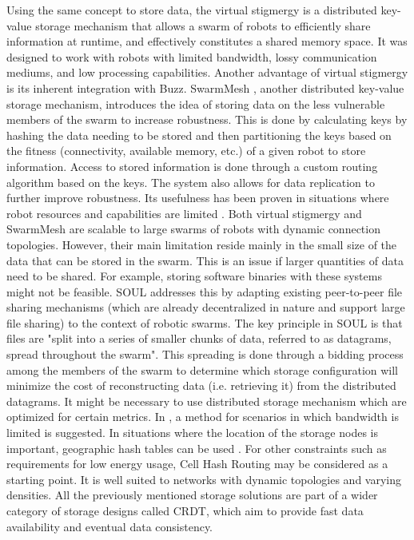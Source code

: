 Using the same concept to store data, the virtual stigmergy \cite{pinciroliTuple2016} is a distributed key-value storage mechanism that allows a swarm of robots to efficiently share information at runtime, and effectively constitutes a shared memory space. It was designed to work with robots with limited bandwidth, lossy communication mediums, and low processing capabilities. Another advantage of virtual stigmergy is its inherent integration with Buzz. SwarmMesh \cite{majcherczykSwarmmesh2020}, another distributed key-value storage mechanism, introduces the idea of storing data on the less vulnerable members of the swarm to increase robustness. This is done by calculating keys by hashing the data needing to be stored and then partitioning the keys based on the fitness (connectivity, available memory, etc.) of a given robot to store information. Access to stored information is done through a custom routing algorithm based on the keys. The system also allows for data replication to further improve robustness. Its usefulness has been proven in situations where robot resources and capabilities are limited \cite{majcherczyk2021distributed}. Both virtual stigmergy and SwarmMesh are scalable to large swarms of robots with dynamic connection topologies. However, their main limitation reside mainly in the small size of the data that can be stored in the swarm. This is an issue if larger quantities of data need to be shared. For example, storing software binaries with these systems might not be feasible. SOUL \cite{varadharajan2020soul} addresses this by adapting existing peer-to-peer file sharing mechanisms (which are already decentralized in nature and support large file sharing) to the context of robotic swarms. The key principle in SOUL is that files are "split into a series of smaller chunks of data, referred to as datagrams, spread throughout the swarm". This spreading is done through a bidding process among the members of the swarm to determine which storage configuration will minimize the cost of reconstructing data (i.e. retrieving it) from the distributed datagrams. It might be necessary to use distributed storage mechanism which are optimized for certain metrics. In \cite{amigoni2017multirobot}, a method for scenarios in which bandwidth is limited is suggested. In situations where the location of the storage nodes is important, geographic hash tables can be used \cite{wu2008ldht,ratnasamy2002ght,ahullo2008supporting}. For other constraints such as requirements for low energy usage, Cell Hash Routing  \cite{araujo2005chr} may be considered as a starting point. It is well suited to networks with dynamic topologies and varying densities. All the previously mentioned storage solutions are part of a wider category of storage designs called \ac{CRDT}, which aim to provide fast data availability and eventual data consistency.

